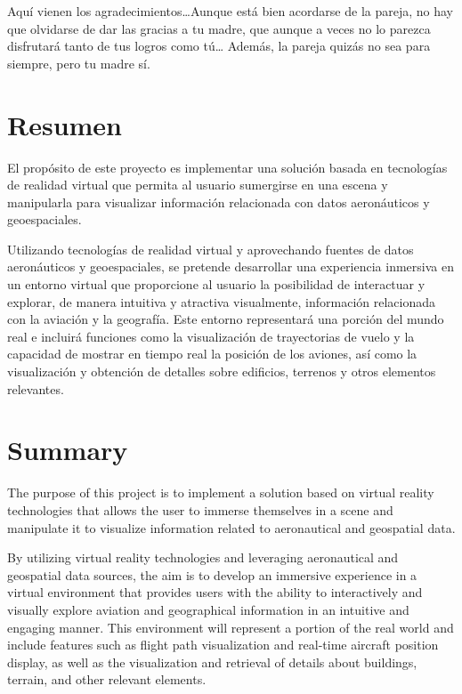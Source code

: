 \documentclass[a4paper, 11pt]{book}
\begin{document}
Aquí vienen los agradecimientos\ldots Aunque está bien acordarse de la pareja, no hay que olvidarse de dar las gracias a tu madre, que aunque a veces no lo parezca disfrutará tanto de tus logros como tú\ldots 
Además, la pareja quizás no sea para siempre, pero tu madre sí.


\chapter*{Resumen}

El propósito de este proyecto es implementar una solución basada en tecnologías de realidad virtual que permita al usuario sumergirse en una escena y manipularla para visualizar información relacionada con datos aeronáuticos y geoespaciales.

Utilizando tecnologías de realidad virtual y aprovechando fuentes de datos aeronáuticos y geoespaciales, se pretende desarrollar una experiencia inmersiva en un entorno virtual que proporcione al usuario la posibilidad de interactuar y explorar, de manera intuitiva y atractiva visualmente, información relacionada con la aviación y la geografía. Este entorno representará una porción del mundo real e incluirá funciones como la visualización de trayectorias de vuelo y la capacidad de mostrar en tiempo real la posición de los aviones, así como la visualización y obtención de detalles sobre edificios, terrenos y otros elementos relevantes.



\chapter*{Summary}

The purpose of this project is to implement a solution based on virtual reality technologies that allows the user to immerse themselves in a scene and manipulate it to visualize information related to aeronautical and geospatial data.

By utilizing virtual reality technologies and leveraging aeronautical and geospatial data sources, the aim is to develop an immersive experience in a virtual environment that provides users with the ability to interactively and visually explore aviation and geographical information in an intuitive and engaging manner. This environment will represent a portion of the real world and include features such as flight path visualization and real-time aircraft position display, as well as the visualization and retrieval of details about buildings, terrain, and other relevant elements.
\end{document}
